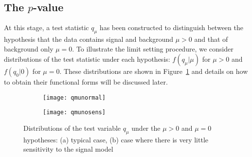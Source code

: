 \subsection{The $p$-value}

At this stage, a test statistic $q_{\mu}$ has been constructed to distinguish between the hypothesis 
that the data contains signal and background $\mu>0$ and that of background only $\mu=0$.
To illustrate the limit setting procedure, we consider distributions of the test statistic under each 
hypothesis: $f\left(q_{\mu} \rvert \mu\right)$ for $\mu>0$ and $f\left(q_{0} \rvert 0\right)$ for $\mu=0$.
These distributions are shown in Figure~\ref{fig:stat.limit.qmunormal} and details on how to obtain their functional forms
 will be discussed later. 

\begin{figure}[t]
\centering
\begin{subfigure}[t]{0.45\textwidth}\texttt{[image: qmunormal]}\caption{}\label{fig:stat.limit.qmunormal}\end{subfigure}
\begin{subfigure}[t]{0.467\textwidth}\texttt{[image: qmunosens]}\caption{}\label{fig:stat.limit.qmunosens}\end{subfigure}
\caption{Distributions of the test variable $q_{\mu}$ under the $\mu>0$ and $\mu=0$ hypotheses: (a) typical case, 
  (b) case where there is very little sensitivity to the signal model}
\label{fig:stat.limit.qmu}
\end{figure}

